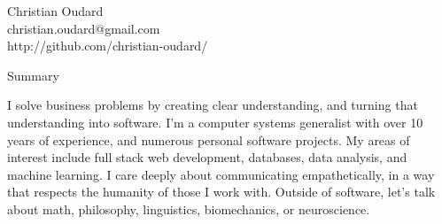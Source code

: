 \documentclass[11pt,oneside]{article}
\begin{document}
\begin{center}
    \textrm{\Huge Christian Oudard} \\
    \vspace{4pt}
    \textsf{
        christian.oudard@gmail.com \\
        http://github.com/christian-oudard/
    }
\end{center}
\vspace{8pt} 

\textrm{\Large Summary}\par
\vspace{8pt}
\textsf{I solve business problems by creating clear understanding, and turning that understanding into software. I'm a computer systems generalist with over 10 years of experience, and numerous personal software projects. My areas of interest include full stack web development, databases, data analysis, and machine learning. I care deeply about communicating empathetically, in a way that respects the humanity of those I work with. Outside of software, let's talk about math, philosophy, linguistics, biomechanics, or neuroscience.}

\vspace{12pt}
\end{document}
